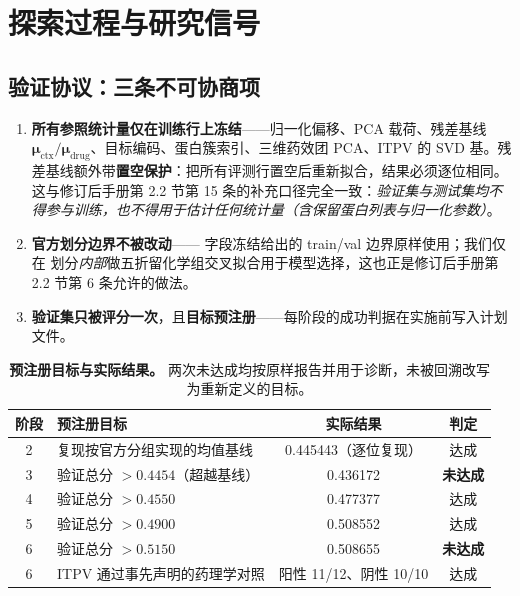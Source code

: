 \section{探索过程与研究信号}
\label{sec:signals}

\subsection{验证协议：三条不可协商项}
\label{sec:protocol}

\begin{enumerate}
\item \textbf{所有参照统计量仅在训练行上冻结}——归一化偏移、PCA 载荷、残差基线 $\bm{\mu}_{\text{ctx}}/\bm{\mu}_{\text{drug}}$、目标编码、蛋白簇索引、三维药效团 PCA、ITPV 的 SVD 基。残差基线额外带\textbf{置空保护}：把所有评测行置空后重新拟合，结果必须逐位相同。这与修订后手册第 2.2 节第 15 条的补充口径完全一致：\emph{验证集与测试集均不得参与训练，也不得用于估计任何统计量（含保留蛋白列表与归一化参数）}。
\item \textbf{官方划分边界不被改动}—— 字段冻结给出的 train/val 边界原样使用；我们仅在  划分\emph{内部}做五折留化学组交叉拟合用于模型选择，这也正是修订后手册第 2.2 节第 6 条允许的做法。
\item \textbf{验证集只被评分一次}，且\textbf{目标预注册}——每阶段的成功判据在实施前写入计划文件。
\end{enumerate}

\begin{table}[H]
\centering\small
\caption{\textbf{预注册目标与实际结果。} 两次未达成均按原样报告并用于诊断，未被回溯改写为重新定义的目标。}
\label{tab:targets}
\begin{tabular}{clcc}
\toprule
阶段 & 预注册目标 & 实际结果 & 判定 \\
\midrule
2 & 复现按官方分组实现的均值基线 & 0.445443（逐位复现） & 达成 \\
3 & 验证总分 $>0.4454$（超越基线） & 0.436172 & \textbf{未达成} \\
4 & 验证总分 $>0.4550$ & 0.477377 & 达成 \\
5 & 验证总分 $>0.4900$ & 0.508552 & 达成 \\
6 & 验证总分 $>0.5150$ & 0.508655 & \textbf{未达成} \\
6 & ITPV 通过事先声明的药理学对照 & 阳性 11/12、阴性 10/10 & 达成 \\
\bottomrule
\end{tabular}
\end{table}

